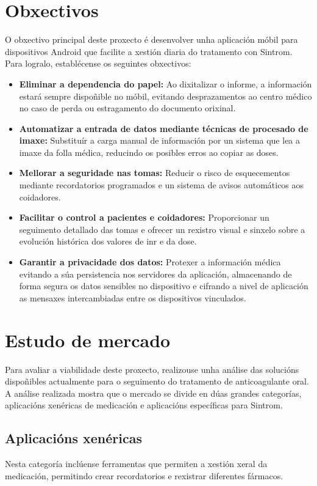 \section{Obxectivos}

O obxectivo principal deste proxecto é desenvolver unha aplicación móbil para dispositivos Android que facilite a xestión diaria do tratamento con Sintrom. Para logralo, establécense os seguintes obxectivos:
\begin{itemize}
    \item\textbf{Eliminar a dependencia do papel:} Ao dixitalizar o informe, a información estará sempre dispoñible no móbil, evitando desprazamentos ao centro médico no caso de perda ou estragamento do documento orixinal.
    \item \textbf{Automatizar a entrada de datos mediante técnicas de procesado de imaxe:} Substituír a carga manual de información por un sistema que lea a imaxe da folla médica, reducindo os posibles erros ao copiar as doses.
    \item \textbf{Mellorar a seguridade nas tomas:} Reducir o risco de esquecementos mediante recordatorios programados e un sistema de avisos automáticos aos coidadores.
    \item \textbf{Facilitar o control a pacientes e coidadores:} Proporcionar un seguimento detallado das tomas e ofrecer un rexistro visual e sinxelo sobre a evolución histórica dos valores de \gls{inr} e da dose.
    \item \textbf{Garantir a privacidade dos datos:} Protexer a información médica evitando a súa persistencia nos servidores da aplicación, almacenando de forma segura os datos sensibles no dispositivo e cifrando a nivel de aplicación as mensaxes intercambiadas entre os dispositivos vinculados.
\end{itemize}

\section{Estudo de mercado}
Para avaliar a viabilidade deste proxecto, realizouse unha análise das solucións dispoñibles actualmente para o seguimento do tratamento de anticoagulante oral. A análise realizada mostra que o mercado se divide en dúas grandes categorías, aplicacións xenéricas de medicación e aplicacións específicas para Sintrom.

\subsection{Aplicacións xenéricas}
\label{subsec:aplicacións_xenericas}
Nesta categoría inclúense ferramentas que permiten a xestión xeral da medicación, permitindo crear recordatorios e rexistrar diferentes fármacos.

